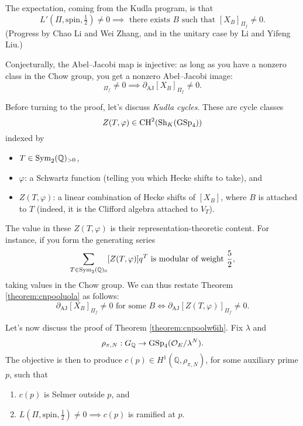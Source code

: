 \documentclass[reqno]{amsart} 
\begin{document}
The expectation, coming from the Kudla program, is that
\begin{equation*}
  L '(\Pi, \mathrm{spin}, \tfrac{1}{2}) \neq 0 \implies
  \text{ there exists $B$ such that }
  [X_B]_{\Pi_f} \neq 0.
\end{equation*}
(Progress by Chao Li and Wei Zhang, and in the unitary case by Li and Yifeng Liu.)

Conjecturally, the Abel--Jacobi map is injective: as long as you have a nonzero class in the Chow group, you get a nonzero Abel--Jacobi image:
\begin{equation*}
  [X_B]_{\Pi_f} \neq 0 \implies \partial_{\mathrm{AJ}}[X_B]_{\Pi_f} \neq 0.
\end{equation*}

Before turning to the proof, let's discuss \emph{Kudla cycles}.  These are cycle classes
\begin{equation*}
  Z(T, \varphi) \in \operatorname{CH}^2(\operatorname{Sh}_K(\operatorname{GSp}_4))
\end{equation*}
indexed by
\begin{itemize}
\item $T \in \operatorname{Sym}_2(\mathbb{Q})_{> 0}$,
\item $\varphi$: a Schwartz function (telling you which Hecke shifts to take), and
\item $Z(T, \varphi)$: a linear combination of Hecke shifts of $[X_B]$, where $B$ is attached to $T$ (indeed, it is the Clifford algebra attached to $V_T$).
\end{itemize}
The value in these $Z(T, \varphi)$ is their representation-theoretic content.  For instance, if you form the generating series
\begin{equation*}
  \sum_{T \in \operatorname{Sym}_2(\mathbb{Q})_{0}}
  [Z(T, \varphi)] q^T \text{ is modular of weight }  \frac{5}{2},
\end{equation*}
taking values in the Chow group.  We can thus restate Theorem \ref{theorem:cnpooluola} as follows:
\begin{equation*}
  \partial_{\mathrm{AJ}}[X_B]_{\Pi_f} \neq 0 \text{ for some } B
  \iff
  \partial_{\mathrm{AJ}}[Z(T, \varphi)]_{\Pi_f} \neq 0.
\end{equation*}

Let's now discuss the proof of Theorem \ref{theorem:cnpoolw6ih}.  Fix $\lambda$ and
\begin{equation*}
  \rho_{\pi, N} : G_{\mathbb{Q}} \rightarrow \operatorname{GSp}_4(\mathcal{O}_E/\lambda^N).
\end{equation*}
The objective is then to produce $c(p) \in H^1(\mathbb{Q}, \rho_{\pi, N})$, for some auxiliary prime $p$, such that
\begin{enumerate}
\item $c(p)$ is Selmer outside $p$, and
\item $L(\Pi, \mathrm{spin}, \tfrac{1}{2}) \neq 0 \implies c(p)$ is ramified at $p$.
\end{enumerate}
\end{document}
